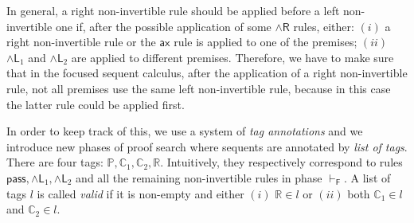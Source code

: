 \documentclass[submission,copyright,creativecommons]{eptcs}
\theoremstyle{definition}
\newtheorem{defn}{Definition}[section]
\newcommand{\tr}{\otimes \mathsf{R}}
\newcommand{\pass}{\mathsf{pass}}
\newcommand{\unitr}{\mathsf{IR}}
\newcommand{\andlone}{\land \mathsf{L}_{1}}
\newcommand{\andltwo}{\land \mathsf{L}_{2}}
\newcommand{\andli}{\land \mathsf{L}_{i}}
\newcommand{\andr}{\land \mathsf{R}}
\newcommand{\ax}{\mathsf{ax}}
\newcommand{\Pass}{\mathsf{P}}
\newcommand{\F}{\mathsf{F}}
\newcommand{\tP}{\mathbb{P}}
\newcommand{\tCone}{\mathbb{C}_1}
\newcommand{\tCtwo}{\mathbb{C}_2}
\newcommand{\tE}{\mathbb{R}}
\newcommand\niccolo[1]{\mbox{}
{\marginpar{\color{red}NV}}
{\sf\noindent\color{red}#1}}%
\begin{document}
In general, a right non-invertible rule should be applied  before a left non-invertible one if, after the possible application of some $\andr$ rules, either:
$(i)$ a right non-invertible rule or the $\ax$ rule is applied to one of the premises;
$(ii)$ $\andlone$ and $\andltwo$ are applied to different premises.
Therefore, we have to make sure that in the focused sequent calculus, after the application of a right non-invertible rule, not all premises use the same left non-invertible rule, because in this case the latter rule could be applied first.

In order to keep track of this,
we use a system of \emph{tag annotations} and we introduce new phases of proof search where sequents are annotated by \emph{list of tags}. 
There are four tags: $\tP , \tCone , \tCtwo , \tE$. Intuitively, they respectively correspond to rules $\pass , \andlone , \andltwo$ and all the remaining non-invertible rules in phase $\vdash_\F$.
A list of tags $l$ is called \emph{valid} if it is non-empty and either $(i)$ $\tE \in l$ or $(ii)$ both $\tCone \in l$ and $\tCtwo \in l$.

\end{document}
